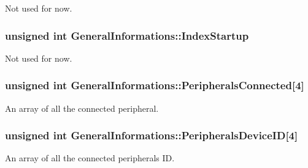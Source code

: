 Not used for now. 

\subsubsection[{\texorpdfstring{Index\+Startup}{IndexStartup}}]{\setlength{\rightskip}{0pt plus 5cm}unsigned int General\+Informations\+::\+Index\+Startup}\hypertarget{struct_general_informations_a112f455e7548254c639cbbc134eeaecc}{}\label{struct_general_informations_a112f455e7548254c639cbbc134eeaecc}


Not used for now. 

\subsubsection[{\texorpdfstring{Peripherals\+Connected}{PeripheralsConnected}}]{\setlength{\rightskip}{0pt plus 5cm}unsigned int General\+Informations\+::\+Peripherals\+Connected\mbox{[}4\mbox{]}}\hypertarget{struct_general_informations_a0e7edf0a7d68bc5186b054bf3764699a}{}\label{struct_general_informations_a0e7edf0a7d68bc5186b054bf3764699a}


An array of all the connected peripheral. 

\subsubsection[{\texorpdfstring{Peripherals\+Device\+ID}{PeripheralsDeviceID}}]{\setlength{\rightskip}{0pt plus 5cm}unsigned int General\+Informations\+::\+Peripherals\+Device\+ID\mbox{[}4\mbox{]}}\hypertarget{struct_general_informations_a6edf5533337f8d17956550364467679b}{}\label{struct_general_informations_a6edf5533337f8d17956550364467679b}


An array of all the connected peripheral\textquotesingle{}s ID. 

